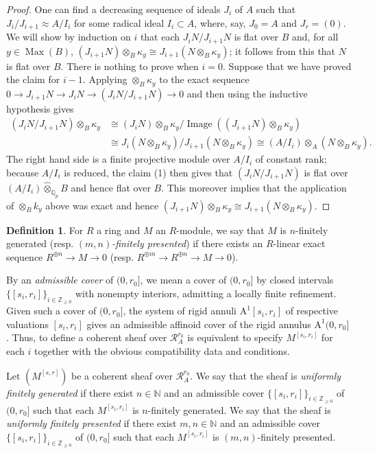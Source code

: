 \documentclass[12pt]{article}
\theoremstyle{definition}
\newtheorem{defn}[theorem]{Definition}
\numberwithin{equation}{theorem}
\newcommand{\calR}{\mathcal{R}}
\newcommand{\QQ}{\mathbb{Q}}
\newcommand{\NN}{\mathbb{N}}
\newcommand{\ZZ}{\mathbb{Z}}
\newcommand{\rmA}{\mathrm{A}}
\def\Qp{\QQ_p}
\DeclareMathOperator{\Image}{Image}
\DeclareMathOperator{\Max}{Max}
\begin{document}
\begin{proof}
One can find a decreasing sequence of ideals $J_i$ of $A$ such that
$J_i/J_{i+1} \approx A/I_i$ for some radical ideal $I_i \subset A$,
where, say, $J_0 = A$ and $J_r = (0)$.  We will show by induction on
$i$ that each $J_i N / J_{i+1} N$ is flat over $B$ and, for all $y \in
\Max(B)$, $(J_{i+1} N) \otimes_B \kappa_y \cong J_{i+1}(N \otimes_B
\kappa_y)$; it follows from this that $N$ is flat over $B$.  There is
nothing to prove when $i=0$. Suppose that we have proved the claim for
$i-1$.  Applying $\otimes_B \kappa_y$ to the exact sequence $0 \to
J_{i+1} N \to J_i N \to (J_i N / J_{i+1} N) \to 0$ and then using the
inductive hypothesis gives
\begin{align*}
(J_i N / J_{i+1} N) \otimes_B \kappa_y
&\cong
(J_i N) \otimes_B \kappa_y / \Image((J_{i+1} N) \otimes_B \kappa_y) \\
&\cong
J_i(N \otimes_B \kappa_y) / J_{i+1} (N \otimes_B \kappa_y)
\cong (A/I_i) \otimes_A (N \otimes_B \kappa_y).
\end{align*}
The right hand side is a finite projective module over $A/I_i$ of constant
rank; because $A/I_i$ is reduced, the claim (1) then gives that $(J_i
N / J_{i+1} N)$ is flat over $(A/I_i) \widehat\otimes_{\Qp} B$ and
hence flat over $B$.  This moreover implies that the application of
$\otimes_B k_y$ above was exact and hence $(J_{i+1} N) \otimes_B
\kappa_y \cong J_{i+1}(N \otimes_B \kappa_y)$.
\end{proof}


\begin{defn}
\label{D:uniform-finite-presentation}
For $R$ a ring and $M$ an $R$-module, we say that $M$ is $n$-finitely generated (resp. \emph{$(m,n)$-finitely presented}) if there exists an $R$-linear exact sequence $R^{\oplus n} \to M \to 0$ (resp. $R^{\oplus m} \to R^{\oplus n} \to M \to 0$).

By an \emph{admissible cover} of $(0, r_0]$, we mean a cover of $(0, r_0]$ by closed intervals $\{[s_i, r_i]\}_{i \in \ZZ_{\geq 0}}$ with nonempty interiors, admitting a locally finite refinement.  Given such a cover of $(0,r_0]$, the system of rigid annuli $\rmA^1[s_i,r_i]$ of respective valuations $[s_i,r_i]$ gives an admissible affinoid cover of the rigid annulus $\rmA^1(0,r_0]$.  Thus, to define a coherent sheaf over $\calR_A^{r_0}$ is equivalent to specify $M^{[s_i,r_i]}$ for each $i$ together with the obvious compatibility data and conditions.

Let $(M^{[s,r]})$ be a coherent sheaf over $\calR_A^{r_0}$.  We say that the sheaf is \emph{uniformly finitely generated} if there exist $n \in \NN$ and an admissible cover $\{[s_i, r_i]\}_{i \in \ZZ_{\geq 0}}$ of $(0,r_0]$ such that each $M^{[s_i,r_i]}$ is $n$-finitely generated.
We say that the sheaf is \emph{uniformly finitely presented} if there exist $m,n \in \NN$ and an admissible cover $\{[s_i, r_i]\}_{i \in \ZZ_{\geq 0}}$ of $(0,r_0]$ such that each $M^{[s_i,r_i]}$ is $(m,n)$-finitely presented.
\end{defn}
\end{document}
